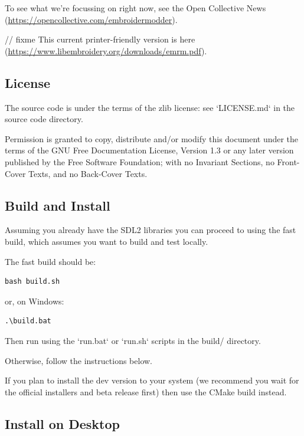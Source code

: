 \documentclass[11pt]{report}
\begin{document}
To see what we're focussing on right now, see the Open Collective
News (\url{https://opencollective.com/embroidermodder}).

// fixme
This current printer-friendly version
is here (\url{https://www.libembroidery.org/downloads/emrm.pdf}).

\subsection{License}

The source code is under the terms of the zlib license: see `LICENSE.md`
in the source code directory.

Permission is granted to copy, distribute and/or modify this document
under the terms of the GNU Free Documentation License, Version 1.3
or any later version published by the Free Software Foundation;
with no Invariant Sections, no Front-Cover Texts, and no Back-Cover Texts.


\subsection{Build and Install}

Assuming you already have the SDL2 libraries you can proceed to using the fast build, which
assumes you want to build and test locally.

The fast build should be:

\begin{verbatim}
bash build.sh
\end{verbatim}

or, on Windows:

\begin{verbatim}
.\build.bat
\end{verbatim}

Then run using the `run.bat` or `run.sh` scripts in the build/ directory.

Otherwise, follow the instructions below.

If you plan to install the dev version to your system (we recommend you wait
for the official installers and beta release first) then use the CMake build
instead.

\subsection{Install on Desktop}
\end{document}
